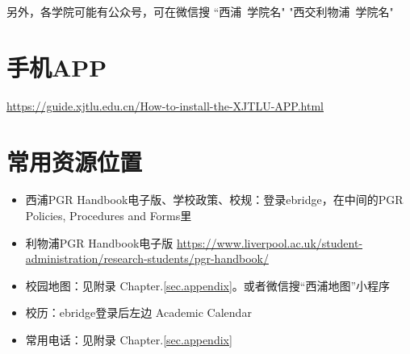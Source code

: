 另外，各学院可能有公众号，可在微信搜 “西浦\ {学院名}" "西交利物浦\ {学院名}"

\section{手机APP}
\url{https://guide.xjtlu.edu.cn/How-to-install-the-XJTLU-APP.html}

\section{常用资源位置}
\begin{itemize}
    \item 西浦PGR Handbook电子版、学校政策、校规：登录ebridge，在中间的PGR Policies, Procedures and Forms里
    \item 利物浦PGR Handbook电子版 \url{https://www.liverpool.ac.uk/student-administration/research-students/pgr-handbook/}
    \item 校园地图：见附录 Chapter.\ref{sec.appendix}。或者微信搜“西浦地图”小程序
    \item 校历：ebridge登录后左边 Academic Calendar
    \item 常用电话：见附录 Chapter.\ref{sec.appendix}
\end{itemize}

